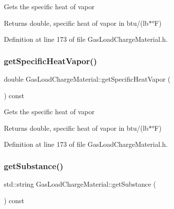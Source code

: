 Gets the specific heat of vapor

\begin{DoxyReturn}{Returns}
double, specific heat of vapor in btu/(lb$\ast$°F) 
\end{DoxyReturn}


Definition at line 173 of file Gas\+Load\+Charge\+Material.\+h.

\mbox{\label{class_gas_load_charge_material_a9a07e86938bb831e51ac3f53f696a3c3}} 
\subsubsection{\texorpdfstring{get\+Specific\+Heat\+Vapor()}{getSpecificHeatVapor()}\hspace{0.1cm}{\footnotesize\ttfamily [3/3]}}
{\footnotesize\ttfamily double Gas\+Load\+Charge\+Material\+::get\+Specific\+Heat\+Vapor (\begin{DoxyParamCaption}{ }\end{DoxyParamCaption}) const\hspace{0.3cm}{\ttfamily [inline]}}

Gets the specific heat of vapor

\begin{DoxyReturn}{Returns}
double, specific heat of vapor in btu/(lb$\ast$°F) 
\end{DoxyReturn}


Definition at line 173 of file Gas\+Load\+Charge\+Material.\+h.

\mbox{\label{class_gas_load_charge_material_a5f967841f196f6b0b35f32f9610092e3}} 
\subsubsection{\texorpdfstring{get\+Substance()}{getSubstance()}\hspace{0.1cm}{\footnotesize\ttfamily [1/3]}}
{\footnotesize\ttfamily std\+::string Gas\+Load\+Charge\+Material\+::get\+Substance (\begin{DoxyParamCaption}{ }\end{DoxyParamCaption}) const\hspace{0.3cm}{\ttfamily [inline]}}

